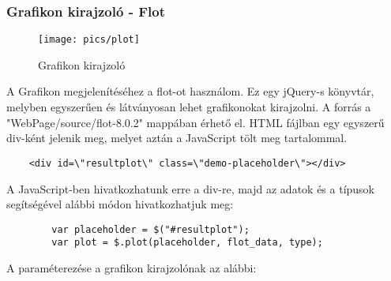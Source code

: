   	\subsubsection{Grafikon kirajzoló - Flot}

	\begin{figure}[h]
	\texttt{[image: pics/plot]}
	\centering
	\caption{Grafikon kirajzoló\label{fig:plot}}

	\end{figure}
		A Grafikon megjelenítéséhez a flot-ot használom. Ez egy jQuery-s könyvtár, melyben egyszerűen és látványosan lehet grafikonokat kirajzolni. A forrás a "WebPage/source/flot-8.0.2" mappában érhető el.
		HTML fájlban egy egyszerű div-ként jelenik meg, melyet aztán a JavaScript tölt meg tartalommal.
				\begin{verbatim}
	<div id=\"resultplot\" class=\"demo-placeholder\"></div>
			\end{verbatim}
		A JavaScript-ben hivatkozhatunk erre a div-re, majd az adatok és a típusok segítségével alábbi módon hivatkozhatjuk meg: 
		\begin{verbatim}
	    var placeholder = $("#resultplot");
	    var plot = $.plot(placeholder, flot_data, type);
		\end{verbatim}
		A paraméterezése a grafikon kirajzolónak az alábbi: 

